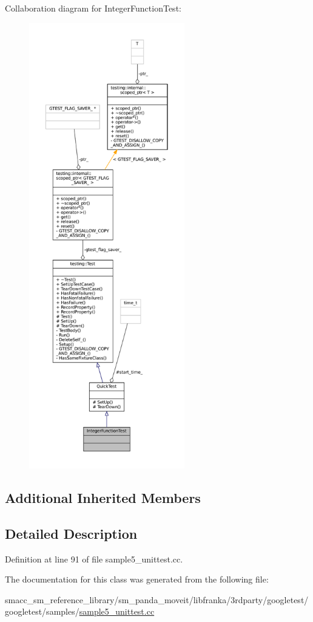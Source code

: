 Collaboration diagram for Integer\+Function\+Test\+:
\nopagebreak
\begin{figure}[H]
\begin{center}
\leavevmode
\includegraphics[height=550pt]{classIntegerFunctionTest__coll__graph}
\end{center}
\end{figure}
\subsection*{Additional Inherited Members}


\subsection{Detailed Description}


Definition at line 91 of file sample5\+\_\+unittest.\+cc.



The documentation for this class was generated from the following file\+:\begin{DoxyCompactItemize}
\item 
smacc\+\_\+sm\+\_\+reference\+\_\+library/sm\+\_\+panda\+\_\+moveit/libfranka/3rdparty/googletest/googletest/samples/\hyperlink{sample5__unittest_8cc}{sample5\+\_\+unittest.\+cc}\end{DoxyCompactItemize}
